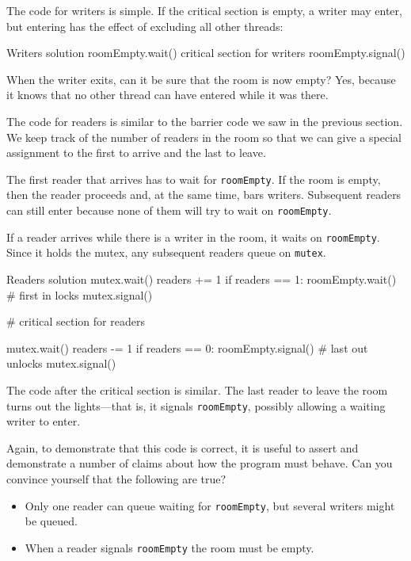 The code for writers is simple.  If the critical section
is empty, a writer may enter, but entering has the effect
of excluding all other threads:

\begin{lstbox}{Writers solution}
roomEmpty.wait()
    critical section for writers
roomEmpty.signal()
\end{lstbox}

When the writer exits, can it be sure that the room is
now empty?  Yes, because it knows that no other thread can
have entered while it was there.

The code for readers is similar to the barrier code we
saw in the previous section.  We keep track of the number
of readers in the room so that we can give a special assignment
to the first to arrive and the last to leave.

The first reader that arrives has to wait for {\tt roomEmpty}.
If the room is empty, then the reader proceeds and, at the
same time, bars writers.  Subsequent readers can still enter
because none of them will try to wait on {\tt roomEmpty}.

If a reader arrives while there is a writer in the room,
it waits on {\tt roomEmpty}.  Since it holds the mutex, any
subsequent readers queue on {\tt mutex}.

\begin{lstbox}{Readers solution}
mutex.wait()
    readers += 1
    if readers == 1:
        roomEmpty.wait()     # first in locks
mutex.signal()

# critical section for readers

mutex.wait()
    readers -= 1
    if readers == 0:
        roomEmpty.signal()   # last out unlocks
mutex.signal()
\end{lstbox}

The code after the critical section is similar.  The last reader
to leave the room turns out the lights---that is, it signals
{\tt roomEmpty}, possibly allowing a waiting writer to enter.

Again, to demonstrate that this code is correct, it is useful
to assert and demonstrate a number of claims about how the program
must behave.  Can you convince yourself that the following are
true?

\begin{itemize}

\item Only one reader can queue waiting for {\tt roomEmpty},
but several writers might be queued.

\item When a reader signals {\tt roomEmpty} the room must
be empty.

\end{itemize}

